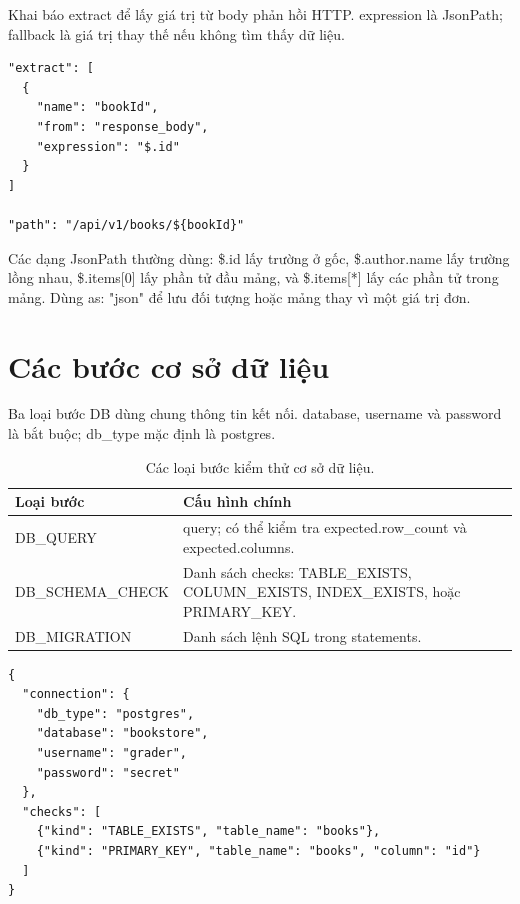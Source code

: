 \documentclass[../BTL.tex]{subfiles}
\begin{document}
Khai báo \textnormal{extract} để lấy giá trị từ body phản hồi HTTP. \textnormal{expression} là JsonPath; \textnormal{fallback} là giá trị thay thế nếu không tìm thấy dữ liệu.

\begin{lstlisting}[caption={Ví dụ trích xuất mã sách và dùng ở bước sau},label={lst:extract-example}]
"extract": [
  {
    "name": "bookId",
    "from": "response_body",
    "expression": "$.id"
  }
]

"path": "/api/v1/books/${bookId}"
\end{lstlisting}

Các dạng JsonPath thường dùng: \textnormal{\$.id} lấy trường ở gốc, \textnormal{\$.author.name} lấy trường lồng nhau, \textnormal{\$.items[0]} lấy phần tử đầu mảng, và \textnormal{\$.items[*]} lấy các phần tử trong mảng. Dùng \textnormal{as: "json"} để lưu đối tượng hoặc mảng thay vì một giá trị đơn.

\section{Các bước cơ sở dữ liệu}

Ba loại bước DB dùng chung thông tin kết nối. \textnormal{database}, \textnormal{username} và \textnormal{password} là bắt buộc; \textnormal{db\_type} mặc định là \textnormal{postgres}.

\begin{table}[H]
\centering
\begin{tabularx}{\textwidth}{|p{3.2cm}|X|}
\hline
Loại bước & Cấu hình chính \\ \hline
\textnormal{DB\_QUERY} & \textnormal{query}; có thể kiểm tra \textnormal{expected.row\_count} và \textnormal{expected.columns}. \\ \hline
\textnormal{DB\_\allowbreak SCHEMA\_\allowbreak CHECK} & Danh sách \textnormal{checks}: \textnormal{TABLE\_EXISTS}, \textnormal{COLUMN\_EXISTS}, \textnormal{INDEX\_EXISTS}, hoặc \textnormal{PRIMARY\_KEY}. \\ \hline
\textnormal{DB\_\allowbreak MIGRATION} & Danh sách lệnh SQL trong \textnormal{statements}. \\ \hline
\end{tabularx}
\caption{Các loại bước kiểm thử cơ sở dữ liệu.}
\label{tab:db-step-types}
\end{table}

\begin{lstlisting}[caption={Ví dụ kiểm tra bảng và khóa chính},label={lst:db-schema-example}]
{
  "connection": {
    "db_type": "postgres",
    "database": "bookstore",
    "username": "grader",
    "password": "secret"
  },
  "checks": [
    {"kind": "TABLE_EXISTS", "table_name": "books"},
    {"kind": "PRIMARY_KEY", "table_name": "books", "column": "id"}
  ]
}
\end{lstlisting}
\end{document}
